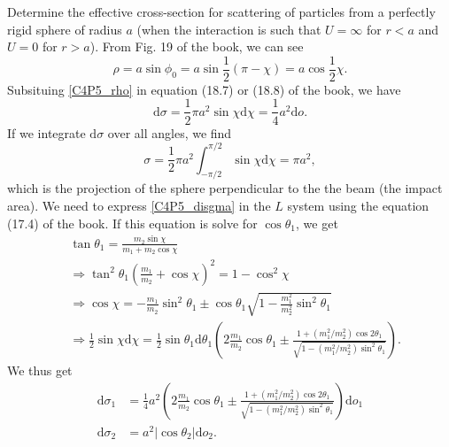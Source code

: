 \begin{problem}
{
Determine the effective cross-section for scattering of particles from a perfectly rigid sphere of radius $a$ (\ie when the interaction is such that $U=\infty$ for $r<a$ and $U=0$ for $r>a$).
}
{
From Fig. 19 of the book, we can see
\begin{equation}
    \rho = a\sin{\phi_0}=a\sin{\frac{1}{2}(\pi-\chi)}=a\cos{\frac{1}{2}\chi}. \label{C4P5_rho}
\end{equation} 
Subsituing \eqref{C4P5_rho} in equation (18.7) or (18.8) of the book, we have
\begin{equation}
    \mathrm{d}\sigma=\frac{1}{2}\pi a^2 \sin{\chi}\mathrm{d}\chi=\frac{1}{4}a^2\mathrm{d}o. \label{C4P5_disgma}
\end{equation}
If we integrate $\mathrm{d}\sigma$ over all angles, we find
\begin{equation*}
    \sigma = \frac{1}{2}\pi a^2  \int_{-\pi/2}^{\pi/2} \sin{\chi}\mathrm{d}\chi =\pi a^2, 
\end{equation*}
which is the projection of the sphere perpendicular to the the beam (\ie the impact area). We need to express \eqref{C4P5_disgma} in the $L$ system using the equation (17.4) of the book. If this equation is solve for $\cos{\theta_1}$, we get
\begin{align*}
    &\tan{\theta_1} = \frac{m_2\sin{\chi}}{m_1+m_2\cos{\chi}}\\
    &\Rightarrow \tan^2{\theta_1}\left( \frac{m_1}{m_2} + \cos{\chi} \right)^2 = 1 - \cos^2{\chi} \\
    &\Rightarrow \cos{\chi} = -\frac{m_1}{m_2}\sin^2{\theta_1} \pm \cos{\theta_1}\sqrt{1-\frac{m_1^2}{m_2^2}\sin^2{\theta_1}} \\
    &\Rightarrow \frac{1}{2}\sin{\chi}\mathrm{d}\chi = \frac{1}{2}\sin{\theta_1} \mathrm{d}\theta_1 \left( 2\frac{m_1}{m_2}\cos{\theta_1} \pm \frac{1+(m_1^2/m_2^2)\cos{2\theta_1}}{\sqrt{1-(m_1^2/m_2^2)\sin^2{\theta_1}}} \right).
\end{align*}
We thus get
}
{
\begin{align*}
    \mathrm{d}\sigma_1 &= \frac{1}{4}a^2\left( 2\frac{m_1}{m_2}\cos{\theta_1} \pm \frac{1+(m_1^2/m_2^2)\cos{2\theta_1}}{\sqrt{1-(m_1^2/m_2^2)\sin^2{\theta_1}}} \right) \mathrm{d}o_1 \\
    \mathrm{d}\sigma_2 &= a^2|\cos{\theta_2}|\mathrm{d}o_2.
\end{align*}
}
\end{problem}